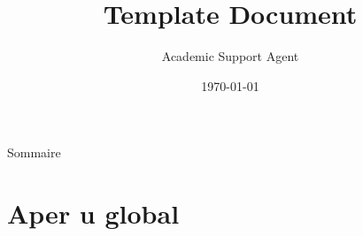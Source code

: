 \documentclass{article}
\title{Template Document}
\author{Academic Support Agent}
\date{\today}
\begin{document}
\maketitle

\begin{frame}
  \titlepage
\end{frame}





\begin{frame}{Sommaire}
  
\end{frame}




\section{Aper u global}
\end{document}
